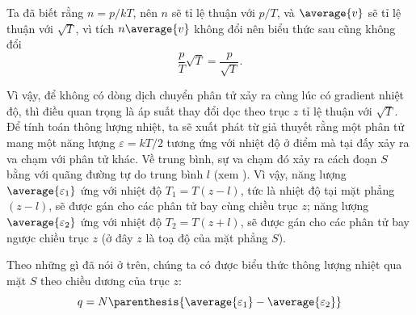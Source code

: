 Ta đã biết rằng $n=p/kT$, nên $n$ sẽ tỉ lệ thuận với $p/T$, và $\average{v}$ sẽ tỉ lệ thuận với $\sqrt{T}$, vì tích $n\average{v}$ không đổi nên biểu thức sau cũng không đổi
\begin{equation*}
    \frac{p}{T}\sqrt{T} = \frac{p}{\sqrt{T}}.
\end{equation*}

\noindent
Vì vậy, để không có dòng dịch chuyển phân tử xảy ra cùng lúc có gradient nhiệt độ, thì điều quan trọng là áp suất thay đổi dọc theo trục $z$ tỉ lệ thuận với $\sqrt{T}$.
Để tính toán thông lượng nhiệt, ta sẽ xuất phát từ giả thuyết rằng một phân tử mang một năng lượng $\varepsilon=kT/2$ tương ứng với nhiệt độ ở điểm mà tại đấy xảy ra va chạm với phân tử khác. Về trung bình, sự va chạm đó xảy ra cách đoạn $S$ bằng với quãng đường tự do trung bình $l$ (xem ). Vì vậy, năng lượng $\average{\varepsilon_1}$ ứng với nhiệt độ $T_1=T(z-l)$, tức là nhiệt độ tại mặt phẳng $(z-l)$, sẽ được gán cho các phân tử bay cùng chiều trục $z$; năng lượng $\average{\varepsilon_2}$ ứng với nhiệt độ $T_2=T(z+l)$, sẽ được gán cho các phân tử bay ngược chiều trục $z$ (ở đây $z$ là toạ độ của mặt phẳng $S$).

Theo những gì đã nói ở trên, chúng ta có được biểu thức thông lượng nhiệt qua mặt $S$ theo chiều dương của trục $z$:
\begin{equation*}
    q = N\parenthesis{\average{\varepsilon_1} - \average{\varepsilon_2}}
\end{equation*}

